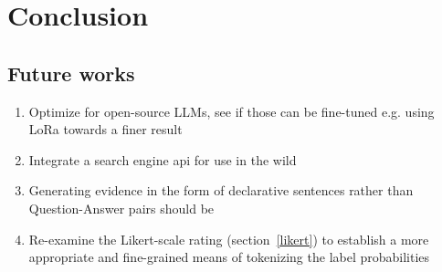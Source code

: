 
\section{Conclusion}
\label{sec:conclusion}

\subsection{Future works}
\begin{enumerate}
    \item Optimize for open-source LLMs, see if those can be fine-tuned e.g. using LoRa towards a finer result
    \item Integrate a search engine api for use in the wild
    \item Generating evidence in the form of declarative sentences rather than Question-Answer pairs should be 
    \item Re-examine the Likert-scale rating (section~\ref{likert}) to establish a more appropriate and fine-grained means of tokenizing the label probabilities
\end{enumerate}